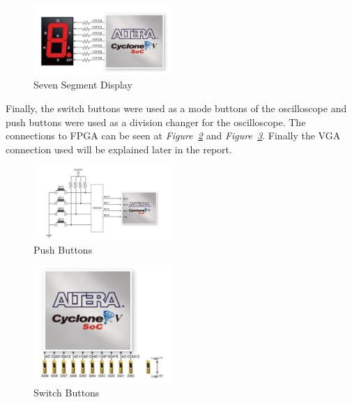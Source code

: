\documentclass[paper]{IEEEtran}
\begin{document}
	
	\begin{figure}[H]
		\setlength{\unitlength}{\textwidth}
		\center 
		\includegraphics[width=0.47\textwidth]{SSD}
		\caption{\label{fig:SSD} Seven Segment Display}
	\end{figure}
	
	Finally, the switch buttons were used as a mode buttons of the oscilloscope and push buttons were used as a division changer for the oscilloscope. The connections to FPGA can be seen at \textit{Figure~\ref{fig:pushbuttons}} and \textit{Figure~\ref{fig:switchbuttons}}. Finally the VGA connection used will be explained later in the report. 
	
	\begin{figure}[h!]
		\setlength{\unitlength}{\textwidth}
		\center 
		\includegraphics[width=0.47\textwidth]{pushbuttons}
		\caption{\label{fig:pushbuttons} Push Buttons}
	\end{figure}
	
	
	\begin{figure}[h!]
		\setlength{\unitlength}{\textwidth}
		\center 
		\includegraphics[width=0.47\textwidth]{switchbuttons}
		\caption{\label{fig:switchbuttons} Switch Buttons}
	\end{figure}
	
	
	
	\-\\[1cm]
	
\end{document}
